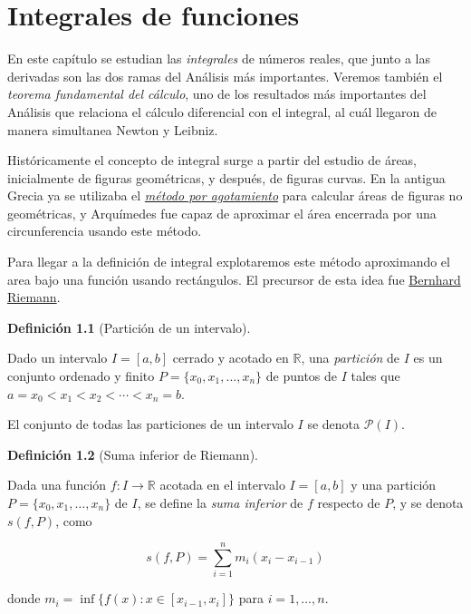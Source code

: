 \documentclass[
  a4paper,
]{scrreport}
\theoremstyle{plain}
\theoremstyle{plain}
\theoremstyle{definition}
\newtheorem{definition}{Definición}[chapter]
\theoremstyle{plain}
\theoremstyle{definition}
\theoremstyle{remark}
\begin{document}

\hypertarget{integrales-de-funciones}{%
\chapter{Integrales de funciones}\label{integrales-de-funciones}}

En este capítulo se estudian las \emph{integrales} de números reales,
que junto a las derivadas son las dos ramas del Análisis más
importantes. Veremos también el \emph{teorema fundamental del cálculo},
uno de los resultados más importantes del Análisis que relaciona el
cálculo diferencial con el integral, al cuál llegaron de manera
simultanea Newton y Leibniz.

Históricamente el concepto de integral surge a partir del estudio de
áreas, inicialmente de figuras geométricas, y después, de figuras
curvas. En la antigua Grecia ya se utilizaba el
\emph{\href{https://es.wikipedia.org/wiki/M\%C3\%A9todo_por_agotamiento}{método
por agotamiento}} para calcular áreas de figuras no geométricas, y
Arquímedes fue capaz de aproximar el área encerrada por una
circunferencia usando este método.

Para llegar a la definición de integral explotaremos este método
aproximando el area bajo una función usando rectángulos. El precursor de
esta idea fue
\href{https://es.wikipedia.org/wiki/Bernhard_Riemann}{Bernhard Riemann}.

\leavevmode{}%
\begin{definition}[Partición de un
intervalo]\label{def-particion-intervalo}

Dado un intervalo \(I=[a,b]\) cerrado y acotado en \(\mathbb{R}\), una
\emph{partición} de \(I\) es un conjunto ordenado y finito
\(P=\{x_0, x_1, \ldots, x_n\}\) de puntos de \(I\) tales que
\(a=x_0<x_1<x_2<\cdots<x_n=b\).

El conjunto de todas las particiones de un intervalo \(I\) se denota
\(\mathcal{P}(I)\).

\end{definition}

\leavevmode{}%
\begin{definition}[Suma inferior de
Riemann]\label{def-suma-inferior-riemann}

Dada una función \(f: I\to\mathbb{R}\) acotada en el intervalo
\(I=[a,b]\) y una partición \(P=\{x_0, x_1, \ldots, x_n\}\) de \(I\), se
define la \emph{suma inferior} de \(f\) respecto de \(P\), y se denota
\(s(f,P)\), como

\[
s(f,P) = \sum_{i=1}^n m_i(x_i-x_{i-1})
\]

donde \(m_i=\inf\{f(x): x\in[x_{i-1},x_i]\}\) para \(i=1,\ldots,n\).

\end{definition}
\end{document}
